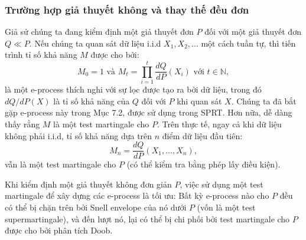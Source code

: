 \begin{algorithm}[htbp]
  \caption{Kiểm định qua cá cược: trường hợp $P$ hợp}
  \label{alg:composite-P}

  \BlankLine
\end{algorithm}

\subsubsection{Trường hợp giả thuyết không và thay thế đều đơn}

Giả sử chúng ta đang kiểm định một giả thuyết đơn $P$ đối với một giả thuyết
đơn $Q \ll P$. Nếu chúng ta quan sát dữ liệu i.i.d $X_1, X_2, \dots$ một cách
tuần tự, thì tiến trình tỉ số khả năng $M$ được cho bởi:
\begin{equation}
    M_0 = 1 \text{ và } M_t = \prod_{i=1}^{t} \frac{dQ}{dP}(X_i) \text{ với } t
    \in \mathbb{N},
\end{equation}
là một e-process thích nghi với sự lọc được tạo ra bởi dữ liệu, trong đó
$dQ/dP(X)$ là tỉ số khả năng của $Q$ đối với $P$ khi quan sát $X$. Chúng ta đã
bắt gặp e-process này trong Mục 7.2, được sử dụng trong SPRT. Hơn nữa, dễ dàng
thấy rằng $M$ là một test martingale cho $P$. Trên thực tế, ngay cả khi dữ liệu
không phải i.i.d, tỉ số khả năng dựa trên $n$ điểm dữ liệu đầu tiên:
\begin{equation}
    M_n = \frac{dQ}{dP}(X_1, \dots, X_n),
\end{equation}
vẫn là một test martingale cho $P$ (có thể kiểm tra bằng phép lấy điều kiện).

Khi kiểm định một giả thuyết không đơn giản $P$, việc sử dụng một test
martingale để xây dựng các e-process là tối ưu: Bất kỳ e-process nào cho $P$
đều có thể bị chặn trên bởi Snell envelope của nó dưới $P$ (vốn là một test
supermartingale), và đến lượt nó, lại có thể bị chi phối bởi test martingale
cho $P$ được cho bởi phân tích Doob.


